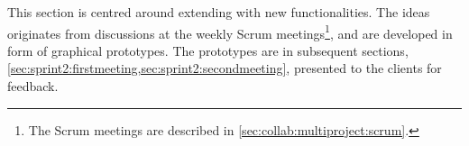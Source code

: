 This section is centred around extending \launcher with new functionalities.
The ideas originates from discussions at the weekly Scrum meetings\footnote{The Scrum meetings are described in \cref{sec:collab:multiproject:scrum}.}, and are developed in form of graphical prototypes.
The prototypes are in subsequent sections, \cref{sec:sprint2:firstmeeting,sec:sprint2:secondmeeting}, presented to the clients for feedback.